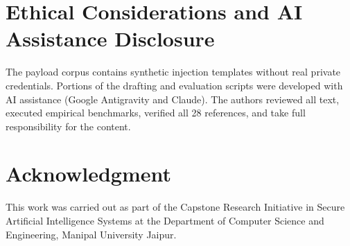 \documentclass[conference]{IEEEtran}
\begin{document}
\section*{Ethical Considerations and AI Assistance Disclosure}
The payload corpus contains synthetic injection templates without real private credentials. Portions of the drafting and evaluation scripts were developed with AI assistance (Google Antigravity and Claude). The authors reviewed all text, executed empirical benchmarks, verified all 28 references, and take full responsibility for the content.

\section*{Acknowledgment}
This work was carried out as part of the Capstone Research Initiative in Secure Artificial Intelligence Systems at the Department of Computer Science and Engineering, Manipal University Jaipur.



\end{document}

